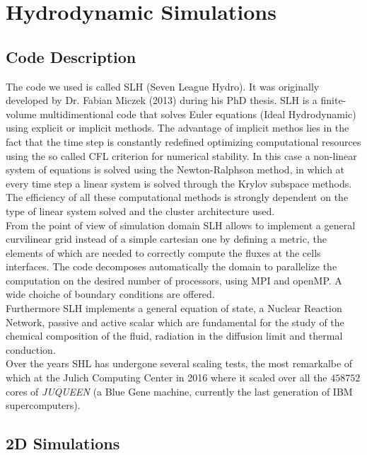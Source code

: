 
\chapter{Hydrodynamic Simulations}
\section{Code Description}

The code we used is called SLH (Seven League Hydro). It was originally developed by Dr. Fabian Miczek (2013) during his PhD thesis. SLH is a finite-volume multidimentional code that solves Euler equations (Ideal Hydrodynamic) using explicit or implicit methods. The advantage of implicit methos lies in the fact that the time step is constantly redefined optimizing computational resources using the so called CFL criterion for numerical stability. In this case a non-linear system of equations is solved using the Newton-Ralphson method, in which at every time step a linear system is solved through the Krylov subspace methods. The efficiency of all these computational methods is strongly dependent on the type of linear system solved and the cluster architecture used. \\
From the point of view of simulation domain SLH allows to implement a general curvilinear grid instead of a simple cartesian one by defining a metric, the elements of which are needed to correctly compute the fluxes at the cells interfaces. The code decomposes automatically the domain to parallelize the computation on the desired number of processors, using MPI and openMP. A wide choiche of boundary conditions are offered. \\
Furthermore SLH implements a general equation of state, a Nuclear Reaction Network, passive and active scalar which are fundamental for the study of the chemical composition of the fluid, radiation in the diffusion limit and thermal conduction. \\
Over the years SHL has undergone several scaling tests, the most remarkalbe of which at the Julich Computing Center in 2016 where it scaled over all the $458752$ cores of \textit{JUQUEEN} (a Blue Gene machine, currently the last generation of IBM supercomputers).
\section{2D Simulations}
